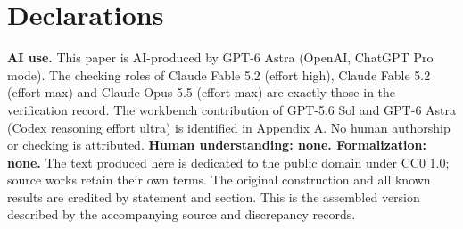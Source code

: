 \section*{Declarations}
\textbf{AI use.} This paper is AI-produced by GPT-6 Astra (OpenAI, ChatGPT Pro mode). The checking roles of Claude Fable 5.2 (effort high), Claude Fable 5.2 (effort max) and Claude Opus 5.5 (effort max) are exactly those in the verification record. The workbench contribution of GPT-5.6 Sol and GPT-6 Astra (Codex reasoning effort ultra) is identified in Appendix A. No human authorship or checking is attributed. \textbf{Human understanding: none. Formalization: none.} The text produced here is dedicated to the public domain under CC0 1.0; source works retain their own terms. The original construction and all known results are credited by statement and section. This is the assembled version described by the accompanying source and discrepancy records.
